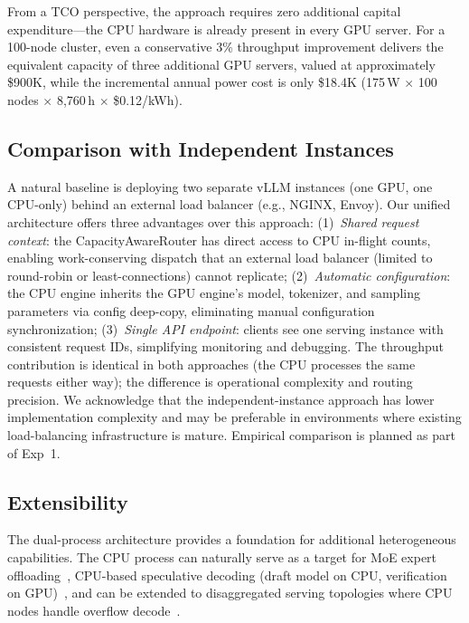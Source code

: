 \documentclass[10pt,conference]{IEEEtran}
\begin{document}
From a TCO perspective, the approach requires zero additional capital expenditure---the CPU hardware is already present in every GPU server.
For a 100-node cluster, even a conservative 3\% throughput improvement delivers the equivalent capacity of three additional GPU servers, valued at approximately \$900K, while the incremental annual power cost is only \$18.4K (175\,W $\times$ 100 nodes $\times$ 8{,}760\,h $\times$ \$0.12/kWh).

\subsection{Comparison with Independent Instances}

A natural baseline is deploying two separate vLLM instances (one GPU, one CPU-only) behind an external load balancer (e.g., NGINX, Envoy).
Our unified architecture offers three advantages over this approach:
(1)~\emph{Shared request context}: the CapacityAwareRouter has direct access to CPU in-flight counts, enabling work-conserving dispatch that an external load balancer (limited to round-robin or least-connections) cannot replicate;
(2)~\emph{Automatic configuration}: the CPU engine inherits the GPU engine's model, tokenizer, and sampling parameters via config deep-copy, eliminating manual configuration synchronization;
(3)~\emph{Single API endpoint}: clients see one serving instance with consistent request IDs, simplifying monitoring and debugging.
The throughput contribution is identical in both approaches (the CPU processes the same requests either way); the difference is operational complexity and routing precision.
We acknowledge that the independent-instance approach has lower implementation complexity and may be preferable in environments where existing load-balancing infrastructure is mature.
Empirical comparison is planned as part of Exp~1.

\subsection{Extensibility}

The dual-process architecture provides a foundation for additional heterogeneous capabilities.
The CPU process can naturally serve as a target for MoE expert offloading~\cite{rajbhandari2022deepspeedmoe}, CPU-based speculative decoding (draft model on CPU, verification on GPU)~\cite{leviathan2023speculative, dovetail2024}, and can be extended to disaggregated serving topologies where CPU nodes handle overflow decode~\cite{zhong2024distserve}.
\end{document}
